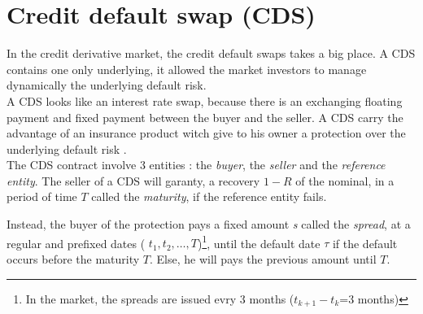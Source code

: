 
\section{Credit default swap (CDS)}
\label{sec:credit-default-swap}

\qquad In the credit derivative market, the credit default swaps takes a big place. A
CDS contains  one only  underlying, it  allowed the  market investors  to manage
dynamically the underlying default risk. \\

A CDS looks like  an interest rate swap, because there  is an exchanging floating
payment and fixed  payment between the buyer  and the seller. A  CDS carry the
advantage of an insurance product witch give  to his owner a protection over the
underlying default risk .\\

The CDS  contract involve 3  entities : the \textit{buyer},  the \textit{seller}
and the \textit{reference entity}. The seller  of a CDS will garanty, a recovery
$1-R$ of the nominal,  in a period of time $T$  called the \textit{maturity}, if
the reference entity fails.\\
\begin{center}
\end{center}
Instead, the buyer of the protection pays a fixed amount \textit{s} called the
\textit{spread},   at  a   regular  and   prefixed  dates   (  $t_1,t_2,   \dots
,T$)\footnote{In   the  market,   the   spreads  are   issued   evry  3   months
  ($t_{k+1}-t_k$=3 months)}, until the default date $\tau$
if the default  occurs before the maturity  $T$. Else, he will  pays the previous
amount until $T$. \\


